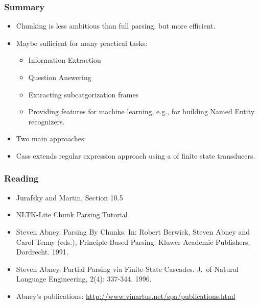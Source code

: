\begin{frame}[fragile]
  \frametitle{Summary}

  \begin{itemize}
  \item<1-> Chunking is less ambitious than full parsing, but more efficient.
  \item<2-> Maybe sufficient for many practical tasks:
      \begin{itemize}
        \item Information Extraction
        \item Question Answering
        \item Extracting subcatgorization frames
        \item Providing features for machine learning, e.g., for
          building Named Entity recognizers.
      \end{itemize}
  \item<3-> Two main approaches:
  \item<4-> Cass extends regular expression approach using a  of
finite state transducers.
    
  \end{itemize}

\end{frame}

\begin{frame}[fragile]
  \frametitle{Reading}

  \begin{itemize}

  \item Jurafsky and Martin, Section 10.5
  \item NLTK-Lite Chunk Parsing Tutorial
  \item Steven Abney. Parsing By Chunks. In: Robert Berwick, Steven
    Abney and Carol Tenny (eds.), Principle-Based Parsing. Kluwer
    Academic Publishers, Dordrecht. 1991.
  \item Steven Abney. Partial Parsing via Finite-State Cascades. J.\ of
    Natural Language Engineering, 2(4): 337-344. 1996.
  \item Abney's publications:
    \url{http://www.vinartus.net/spa/publications.html}
   
  \end{itemize}

\end{frame}

